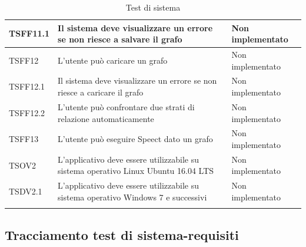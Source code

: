 \documentclass[openany,12pt,a4paper]{report}
\begin{document}
\begin{longtable}{| p{2cm} |p{5cm} | p{2.5cm} |}
	
	\newline TSFF11.1&
	\newline Il sistema deve visualizzare un errore se non riesce a salvare il grafo&
	\newline Non implementato 
	\\[1em]
	\hline
	
	\newline TSFF12&
	\newline L'utente può caricare un grafo&
	\newline Non implementato
	\\[1em]
	\hline
	
	\newline TSFF12.1&
	\newline Il sistema deve visualizzare un errore se non riesce a caricare il grafo&
	\newline Non implementato
	\\[1em]
	\hline
	
	\newline TSFF12.2&
	\newline L'utente può confrontare due strati di relazione automaticamente&
	\newline Non implementato
	\\[1em]
	\hline
	
	
	\newline TSFF13&
	\newline L'utente può eseguire Speect dato un grafo&
	\newline Non implementato
	\\[1em]
	\hline
	
	\newline TSOV2&
	\newline 
	L'applicativo deve essere utilizzabile su sistema operativo Linux Ubuntu 16.04 LTS&
	\newline Non implementato
	\\[1em]
	\hline
	\newline TSDV2.1&
	\newline 
	L'applicativo deve essere utilizzabile su sistema operativo Windows 7 e successivi&
	\newline Non implementato
	\\[1em]
	\hline
\caption{Test di sistema}
\end{longtable}

\subsection{Tracciamento test di sistema-requisiti}
\end{document}
